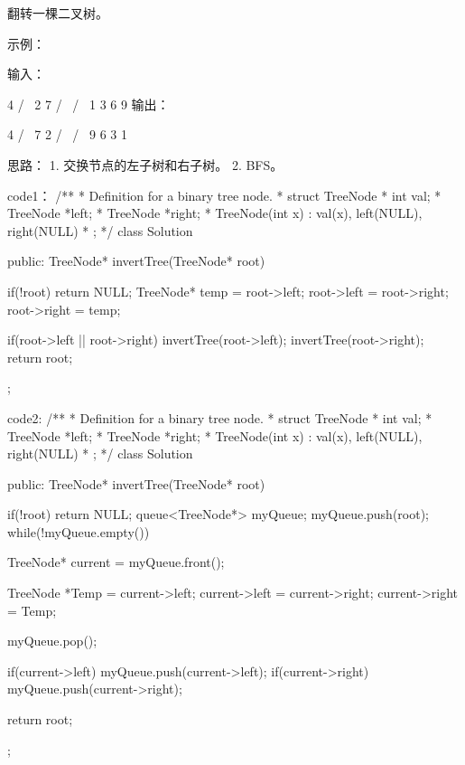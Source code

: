 翻转一棵二叉树。

示例：

输入：

     4
   /   \
  2     7
 / \   / \
1   3 6   9
输出：

     4
   /   \
  7     2
 / \   / \
9   6 3   1

















思路：
1.  交换节点的左子树和右子树。
2. BFS。


















code1：
/**
 * Definition for a binary tree node.
 * struct TreeNode {
 *     int val;
 *     TreeNode *left;
 *     TreeNode *right;
 *     TreeNode(int x) : val(x), left(NULL), right(NULL) {}
 * };
 */
class Solution {
public:
    TreeNode* invertTree(TreeNode* root) {
        if(!root) return NULL;
        TreeNode* temp = root->left;
        root->left = root->right;
        root->right = temp;
        
        if(root->left || root->right)
        {
            invertTree(root->left);
            invertTree(root->right);
        }
        return root;
    }
};


























code2:
/**
 * Definition for a binary tree node.
 * struct TreeNode {
 *     int val;
 *     TreeNode *left;
 *     TreeNode *right;
 *     TreeNode(int x) : val(x), left(NULL), right(NULL) {}
 * };
 */
class Solution {
public:
    TreeNode* invertTree(TreeNode* root) {
        if(!root) return NULL;
        queue<TreeNode*> myQueue;
        myQueue.push(root);
        while(!myQueue.empty())
        {
            TreeNode* current = myQueue.front();
            
            TreeNode *Temp = current->left;
            current->left = current->right;
            current->right = Temp;
            
            myQueue.pop();
            
            if(current->left) myQueue.push(current->left);
            if(current->right) myQueue.push(current->right);
        }
        return root;
    }
};